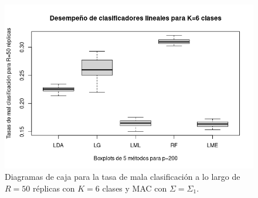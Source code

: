 \documentclass{report}
\begin{document}
\begin{figure} [h]
\begin{multicols}{2}
  		\caption*{$p=100$}
  		\includegraphics[width=\linewidth]{6_clases_p200_sigma_II}\par 
  		\caption*{$p=200$}
  		
  	\end{multicols}
  	\caption{ Diagramas de caja para la tasa de mala clasificación  a lo largo de $R=50$ réplicas con $K=6$ clases y MAC con $\Sigma=\Sigma_1$. }
  	\label{boxk6alta}
  \end{figure}
  
\end{document}
